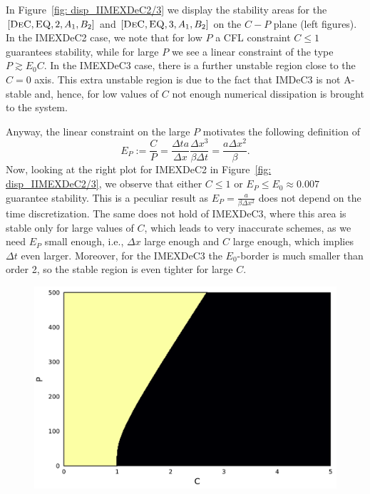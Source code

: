 \begin{example}\label{exa: disp_displaying_stability}
	In Figure~\ref{fig: disp_IIMEXDeC2/3} we display the stability areas for the $[\textsc{DeC}, \textsc{EQ},2,A_1, B_2]$ and $[\textsc{DeC}, \textsc{EQ},3,A_1, B_2]$ on the $C-P$ plane (left figures).
	In the IMEXDeC2 case, we note that for low $P$ a CFL constraint $C\leq 1$ guarantees stability, while for large $P$ we see a linear constraint of the type $P\gtrsim E_0 C $.
	In the IMEXDeC3 case, there is a further unstable region close to the $C=0$ axis. This extra unstable region is due to the fact that IMDeC3 is not A-stable and, hence, for low values of $C$ not enough numerical dissipation is brought to the system.
	
	Anyway, the linear constraint on the large $P$ motivates the following definition of 
	\begin{equation*}
		E_P:=\frac{C}{P}=\frac{\Delta ta}{\Delta x}\frac{\Delta x^3}{\beta\Delta t}=\frac{a \Delta x^2  }{\beta }.
	\end{equation*}
	Now, looking at the right plot for IMEXDeC2 in Figure~\ref{fig: disp_IIMEXDeC2/3}, we observe that either $C\leq 1$ or $E_P\leq E_0 \approx 0.007$ guarantee stability. 
	This is a peculiar result as $E_P=\frac{a  }{\beta \Delta x^2 }$ does not depend on the time discretization.
	The same does not hold of IMEXDeC3, where this area is stable only for large values of $C$, which leads to very inaccurate schemes, as we need $E_P$ small enough, i.e., $\Delta x$ large enough and $C$ large enough, which implies $\Delta t$ even larger.
	Moreover, for the IMEXDeC3 the $E_0$-border is much smaller  than order 2, so the stable region is even tighter for large $C$.
	\begin{figure}
		\centering
		\begin{minipage}[t]{0.32\textwidth}
			\centering
			\includegraphics[width=\textwidth]{pdf/pdepics/disp/contourf_adv_disp_IMEXDeC_gaussLobatto_2_disp_CFD_adv_1_CP.pdf}

\end{minipage}
\end{figure}
\end{example}
